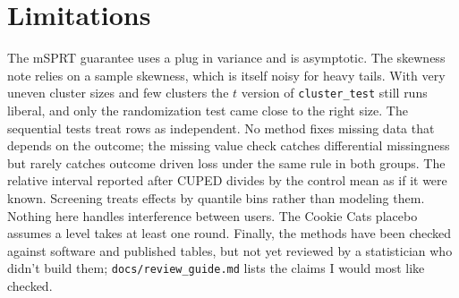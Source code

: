 \documentclass[10pt]{article}
\begin{document}
\section{Limitations}
The mSPRT guarantee uses a plug in variance and is asymptotic. The skewness note relies on a sample skewness, which is itself noisy for heavy tails. With very uneven cluster sizes and few clusters the $t$ version of \texttt{cluster\_test} still runs liberal, and only the randomization test came close to the right size. The sequential tests treat rows as independent. No method fixes missing data that depends on the outcome; the missing value check catches differential missingness but rarely catches outcome driven loss under the same rule in both groups. The relative interval reported after CUPED divides by the control mean as if it were known. Screening treats effects by quantile bins rather than modeling them. Nothing here handles interference between users. The Cookie Cats placebo assumes a level takes at least one round. Finally, the methods have been checked against software and published tables, but not yet reviewed by a statistician who didn't build them; \texttt{docs/review\_guide.md} lists the claims I would most like checked.
\end{document}

